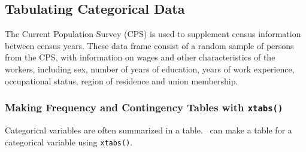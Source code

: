 \subsection{Tabulating Categorical Data}
The Current Population Survey (CPS) is used to supplement census information
between census years. These  data frame consist of a random sample of persons from the
CPS, with information on wages and other characteristics of the workers,
including sex, number of years of education, years of work experience,
occupational status, region of residence and union membership.


\begin{knitrout}
\end{knitrout}


\subsubsection{Making Frequency and Contingency Tables with \texttt{xtabs()}}
Categorical variables are  often summarized in a table.  
\R\ can make a table for a categorical variable using \verb!xtabs()!.

